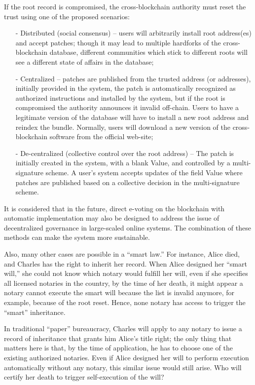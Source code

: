 \begin{multicols}{2}
If the root record is compromised, the cross-blockchain authority must reset the trust using one of the proposed scenarios:
\begin{itemize}
\item[-] Distributed (social consensus) – users will arbitrarily install root address(es) and accept patches; though it may lead to multiple hardforks of the cross-blockchain database, different communities which stick to different roots will see a different state of affairs in the database;
\item[-] Centralized – patches are published from the trusted address (or addresses), initially provided in the system, the patch is automatically recognized as authorized instructions and installed by the system, but if the root is compromised the authority announces it invalid off-chain. Users to have a legitimate version of the database will have to install a new root address and reindex the bundle. Normally, users will download a new version of the cross-blockchain software from the official web-site;
\item[-] De-centralized (collective control over the root address) – The patch is initially created in the system, with a blank Value, and controlled by a multi-signature scheme. A user’s system accepts updates of the field Value where patches are published based on a collective decision in the multi-signature scheme.
\end{itemize}

It is considered that in the future, direct e-voting on the blockchain with automatic implementation may also be designed to address the issue of decentralized governance in large-scaled online systems. The combination of these methods can make the system more sustainable.

\vspace{-.1cm}

Also, many other cases are possible in a “smart law.” For instance, Alice died, and Charles has the right to inherit her record. When Alice designed her “smart will,” she could not know which notary would fulfill her will, even if she specifies all licensed notaries in the country, by the time of her death, it might appear a notary cannot execute the smart will because the list is invalid anymore, for example, because of the root reset. Hence, none notary has access to trigger the “smart” inheritance.

\vspace{-.1cm}

In traditional “paper” bureaucracy, Charles will apply to any notary to issue a record of inheritance that grants him Alice’s title right; the only thing that matters here is that, by the time of application, he has to choose one of the existing authorized notaries. Even if Alice designed her will to perform execution automatically without any notary, this similar issue would still arise. Who will certify her death to trigger self-execution of the will?


\end{multicols}
